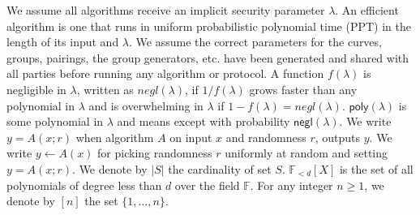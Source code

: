 \noindent We assume all algorithms receive an implicit security parameter $\lambda$. 
An efficient algorithm is one that runs in uniform probabilistic polynomial time (PPT) in the length of its input and $\lambda$. 
We assume the correct parameters for the curves, groups, pairings, the group generators, etc. have been generated and shared with all parties before running any algorithm or protocol. 
A function $f(\lambda)$ is negligible in $\lambda$, written as $\mathit{negl}(\lambda)$, if $1/f(\lambda)$ grows faster than 
any polynomial in $\lambda$ and is overwhelming in $\lambda$ if $1-f(\lambda)=\mathit{negl}(\lambda)$. $\mathsf{poly}(\lambda)$ 
is some polynomial in $\lambda$ and \ewnp means except with probability $\mathsf{negl}(\lambda)$.
We write $y = A(x; r)$ when algorithm $A$ on input $x$ and randomness $r$, outputs $y$.
We write $y \leftarrow A(x)$ for picking randomness $r$ uniformly at random and setting $y = A(x; r)$. We denote by $|S|$ the cardinality of set $S$. 
$\mathbb{F}_{<d}[X]$ is the set of all polynomials of degree less than $d$ over the field $\mathbb{F}$. For any integer 
$n \geq 1$, we denote by $[n]$ the set $\{1, \ldots, n\}$.
\vspace{-0.015in}
